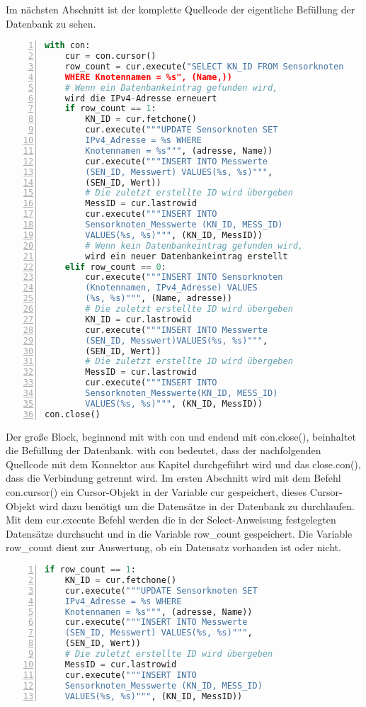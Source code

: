 Im nächsten Abschnitt ist der komplette Quellcode der eigentliche Befüllung der Datenbank zu sehen.
\begin{lstlisting}[caption=Befüllen der Datenbank,frame=single,numbers=left,language=Python]
with con:
	cur = con.cursor()
	row_count = cur.execute("SELECT KN_ID FROM Sensorknoten
	WHERE Knotennamen = %s", (Name,))
	# Wenn ein Datenbankeintrag gefunden wird,
	wird die IPv4-Adresse erneuert
	if row_count == 1:
		KN_ID = cur.fetchone()
		cur.execute("""UPDATE Sensorknoten SET
		IPv4_Adresse = %s WHERE
		Knotennamen = %s""", (adresse, Name))
		cur.execute("""INSERT INTO Messwerte 
		(SEN_ID, Messwert) VALUES(%s, %s)""",
		(SEN_ID, Wert))
		# Die zuletzt erstellte ID wird übergeben
		MessID = cur.lastrowid
		cur.execute("""INSERT INTO 
		Sensorknoten_Messwerte (KN_ID, MESS_ID)
		VALUES(%s, %s)""", (KN_ID, MessID))
		# Wenn kein Datenbankeintrag gefunden wird,
		wird ein neuer Datenbankeintrag erstellt
	elif row_count == 0:
		cur.execute("""INSERT INTO Sensorknoten
		(Knotennamen, IPv4_Adresse) VALUES
		(%s, %s)""", (Name, adresse))
		# Die zuletzt erstellte ID wird übergeben
		KN_ID = cur.lastrowid
		cur.execute("""INSERT INTO Messwerte
		(SEN_ID, Messwert)VALUES(%s, %s)""",
		(SEN_ID, Wert))
		# Die zuletzt erstellte ID wird übergeben
		MessID = cur.lastrowid
		cur.execute("""INSERT INTO 
		Sensorknoten_Messwerte(KN_ID, MESS_ID)
		VALUES(%s, %s)""", (KN_ID, MessID))
con.close()
\end{lstlisting}
Der große Block, beginnend mit with con und endend mit con.close(), beinhaltet die Befüllung der Datenbank. with con bedeutet, dass der nachfolgenden Quellcode mit dem Konnektor aus Kapitel  durchgeführt wird und das close.con(), dass die Verbindung getrennt wird. Im ersten Abschnitt wird mit dem Befehl con.cursor() ein Cursor-Objekt in der Variable cur gespeichert, dieses Cursor-Objekt wird dazu benötigt um die Datensätze in der Datenbank zu durchlaufen. Mit dem cur.execute Befehl werden die in der Select-Anweisung festgelegten Datensätze durchsucht und in die Variable row\_count gespeichert. Die Variable row\_count dient zur Auswertung, ob ein Datensatz vorhanden ist oder nicht.\hfill
\begin{lstlisting}[caption=If-Anweisung des Befüllen der Datenbank,frame=single,numbers=left,language=Python]
if row_count == 1:
	KN_ID = cur.fetchone()
	cur.execute("""UPDATE Sensorknoten SET
	IPv4_Adresse = %s WHERE
	Knotennamen = %s""", (adresse, Name))
	cur.execute("""INSERT INTO Messwerte 
	(SEN_ID, Messwert) VALUES(%s, %s)""",
	(SEN_ID, Wert))
	# Die zuletzt erstellte ID wird übergeben
	MessID = cur.lastrowid
	cur.execute("""INSERT INTO 
	Sensorknoten_Messwerte (KN_ID, MESS_ID)
	VALUES(%s, %s)""", (KN_ID, MessID))
\end{lstlisting}\label{If-Anweisung}

